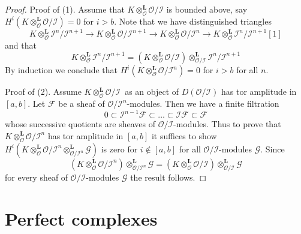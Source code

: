 \begin{proof}
Proof of (1). Assume that
$K \otimes_\mathcal{O}^\mathbf{L} \mathcal{O}/\mathcal{I}$
is bounded above, say
$H^i(K \otimes_\mathcal{O}^\mathbf{L} \mathcal{O}/\mathcal{I}) = 0$
for $i > b$. Note that we have distinguished triangles
$$
K \otimes_\mathcal{O}^\mathbf{L}
\mathcal{I}^n/\mathcal{I}^{n + 1} \to
K \otimes_\mathcal{O}^\mathbf{L}
\mathcal{O}/\mathcal{I}^{n + 1} \to
K \otimes_\mathcal{O}^\mathbf{L}
\mathcal{O}/\mathcal{I}^n \to
K \otimes_\mathcal{O}^\mathbf{L}
\mathcal{I}^n/\mathcal{I}^{n + 1}[1]
$$
and that
$$
K \otimes_\mathcal{O}^\mathbf{L}
\mathcal{I}^n/\mathcal{I}^{n + 1} =
\left(
K \otimes_\mathcal{O}^\mathbf{L}
\mathcal{O}/\mathcal{I}\right)
\otimes_{\mathcal{O}/\mathcal{I}}^\mathbf{L}
\mathcal{I}^n/\mathcal{I}^{n + 1}
$$
By induction we conclude that
$H^i(K \otimes_\mathcal{O}^\mathbf{L} \mathcal{O}/\mathcal{I}^n) = 0$
for $i > b$ for all $n$.

\medskip\noindent
Proof of (2). Assume $K \otimes_\mathcal{O}^\mathbf{L} \mathcal{O}/\mathcal{I}$\
as an object of $D(\mathcal{O}/\mathcal{I})$ has tor amplitude in $[a, b]$.
Let $\mathcal{F}$ be a sheaf of $\mathcal{O}/\mathcal{I}^n$-modules.
Then we have a finite filtration
$$
0 \subset \mathcal{I}^{n - 1}\mathcal{F} \subset \ldots
\subset \mathcal{I}\mathcal{F} \subset \mathcal{F}
$$
whose successive quotients are sheaves of $\mathcal{O}/\mathcal{I}$-modules.
Thus to prove that $K \otimes_\mathcal{O}^\mathbf{L} \mathcal{O}/\mathcal{I}^n$
has tor amplitude in $[a, b]$ it suffices to show
$H^i(K \otimes_\mathcal{O}^\mathbf{L} \mathcal{O}/\mathcal{I}^n
\otimes_{\mathcal{O}/\mathcal{I}^n}^\mathbf{L} \mathcal{G})$
is zero for $i \not \in [a, b]$ for all $\mathcal{O}/\mathcal{I}$-modules
$\mathcal{G}$. Since
$$
\left(K \otimes_\mathcal{O}^\mathbf{L} \mathcal{O}/\mathcal{I}^n\right)
\otimes_{\mathcal{O}/\mathcal{I}^n}^\mathbf{L} \mathcal{G}
=
\left(K \otimes_\mathcal{O}^\mathbf{L} \mathcal{O}/\mathcal{I}\right)
\otimes_{\mathcal{O}/\mathcal{I}}^\mathbf{L} \mathcal{G}
$$
for every sheaf of $\mathcal{O}/\mathcal{I}$-modules $\mathcal{G}$
the result follows.
\end{proof}










\section{Perfect complexes}
\label{section-perfect}

